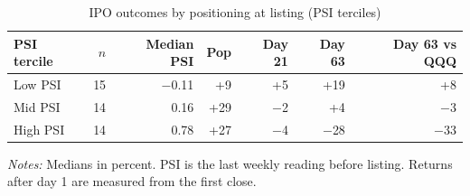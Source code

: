 \begin{table}[!htbp]\centering\small
\caption{IPO outcomes by positioning at listing (PSI terciles)}\label{tab:terciles}

\begin{threeparttable}
\begin{tabular}{lrrrrrr}
\toprule
PSI tercile & $n$ & Median PSI & Pop & Day 21 & Day 63 & Day 63 vs QQQ \\
\midrule
Low PSI & 15 & $-$0.11 & +9 & +5 & +19 & +8 \\
Mid PSI & 14 & 0.16 & +29 & $-$2 & +4 & $-$3 \\
High PSI & 14 & 0.78 & +27 & $-$4 & $-$28 & $-$33 \\
\bottomrule
\end{tabular}
\begin{tablenotes}[flushleft]\footnotesize
\item \textit{Notes:} Medians in percent. PSI is the last weekly reading before listing. Returns after day 1 are measured from the first close.
\end{tablenotes}
\end{threeparttable}

\end{table}
